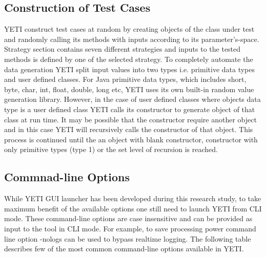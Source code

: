 \subsection{Construction of Test Cases}
YETI construct test cases at random by creating objects of the class under test and randomly calling its methods with inputs according to its parameter's-space. Strategy section contains seven different strategies and inputs to the tested methods is defined by one of the selected strategy. To completely automate the data generation YETI   split input values into two types i.e. primitive data types and user defined classes. For Java primitive data types, which includes short, byte, char, int, float, double, long etc, YETI uses its own built-in random value generation library. However, in the case of user defined classes where objects data type is a user defined class YETI calls its constructor to generate object of that class at run time. It may be possible that the constructor require another object and in this case YETI will recursively calls the constructor of that object. This process is continued until the an object with blank constructor, constructor with only primitive types (type 1) or the set level of recursion is reached. 

\subsection{Commnad-line Options}
While YETI GUI launcher has been developed during this research study, to take maximum benefit of the available options one still need to launch YETI from CLI mode. These command-line options are case insensitive and can be provided as input to the tool in CLI mode. For example, to save processing power command line option -nologs can be used to bypass realtime logging. The following table describes few of the most common command-line options available in YETI.    

